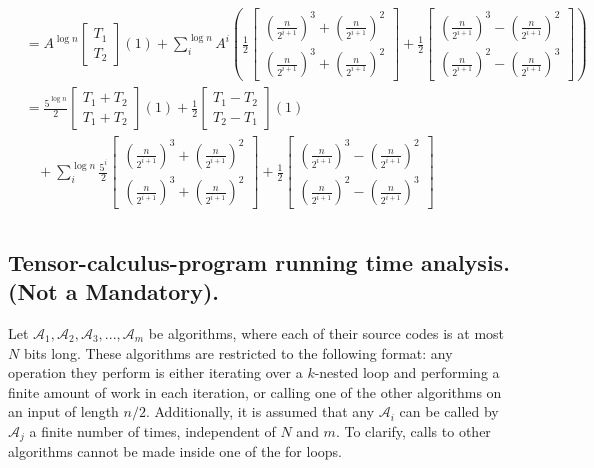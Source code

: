 \begin{equation*}
\begin{split}
     & = A^{\log n} \begin{bmatrix}
       T_{1} \\
       T_{2} 
     \end{bmatrix}(1) +\sum_{i}^{\log n}{ A^{i} \left( \frac{1}{2}\begin{bmatrix}
       \left(\frac{n}{2^{i+1}}\right)^{3} +  \left(\frac{n}{2^{i+1}}\right)^{2}\\
       \left(\frac{n}{2^{i+1}}\right)^{3} +  \left(\frac{n}{2^{i+1}}\right)^{2} 
     \end{bmatrix}+ \frac{1}{2}\begin{bmatrix}
       \left(\frac{n}{2^{i+1}}\right)^{3} -  \left(\frac{n}{2^{i+1}}\right)^{2}\\
        \left(\frac{n}{2^{i+1}}\right)^{2} -\left(\frac{n}{2^{i+1}}\right)^{3} 
    \end{bmatrix} \right)} \\ 
    & = \frac{5^{\log n}}{2} \begin{bmatrix}
      T_{1} + T_{2}\\
      T_{1} + T_{2} 
     \end{bmatrix}(1) + \frac{1}{2} \begin{bmatrix}
       T_{1} - T_{2}\\
       T_{2} -T_{1}
     \end{bmatrix}(1) \\ 
     & \ \ \ \ +\sum_{i}^{\log n}{  \frac{5^{i}}{2}\begin{bmatrix}
       \left(\frac{n}{2^{i+1}}\right)^{3} +  \left(\frac{n}{2^{i+1}}\right)^{2}\\
       \left(\frac{n}{2^{i+1}}\right)^{3} +  \left(\frac{n}{2^{i+1}}\right)^{2} 
     \end{bmatrix}+ \frac{1}{2}\begin{bmatrix}
       \left(\frac{n}{2^{i+1}}\right)^{3} -  \left(\frac{n}{2^{i+1}}\right)^{2}\\
        \left(\frac{n}{2^{i+1}}\right)^{2} -\left(\frac{n}{2^{i+1}}\right)^{3} 
    \end{bmatrix}} \\ 
   \end{split}
 \end{equation*}
\fi 
\fi 

  \subsection{Tensor-calculus-program running time analysis. (Not a Mandatory).}
Let $\mathcal{A}_{1},\mathcal{A}_{2},\mathcal{A}_{3},...,\mathcal{A}_{m}$ be algorithms, where each of their source codes is at most $N$ bits long. These algorithms are restricted to the following format: any operation they perform is either iterating over a $k$-nested loop and performing a finite amount of work in each iteration, or calling one of the other algorithms on an input of length $n/2$. Additionally, it is assumed that any $\mathcal{A}_{i}$ can be called by $\mathcal{A}_{j}$ a finite number of times, independent of $N$ and $m$. To clarify, calls to other algorithms cannot be made inside one of the for loops.


